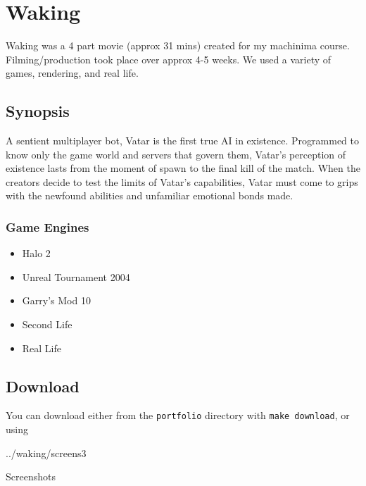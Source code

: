 \section{Waking}
\label{works:waking}

Waking was a 4 part movie (approx 31 mins) created for my machinima
course. Filming/production took place over approx 4-5 weeks. We used a
variety of games, rendering, and real life.

\subsection*{Synopsis}
A sentient multiplayer bot, Vatar is the first true AI in existence.
Programmed to know only the game world and servers that govern them,
Vatar's perception of existence lasts from the moment of spawn to the
final kill of the match. When the creators decide to test the limits
of Vatar's capabilities, Vatar must come to grips with the newfound
abilities and unfamiliar emotional bonds made.

\subsubsection*{Game Engines}
\begin{itemize}
    \item Halo 2
    \item Unreal Tournament 2004
    \item Garry's Mod 10
    \item Second Life
    \item Real Life
\end{itemize}

\subsection*{Download}
You can download either from the \texttt{portfolio} directory with \texttt{make download}, or
using 

\begin{images}{../waking/screens}{3}{\textwidth}
    \caption{Screenshots}
    \centering
\end{images}
